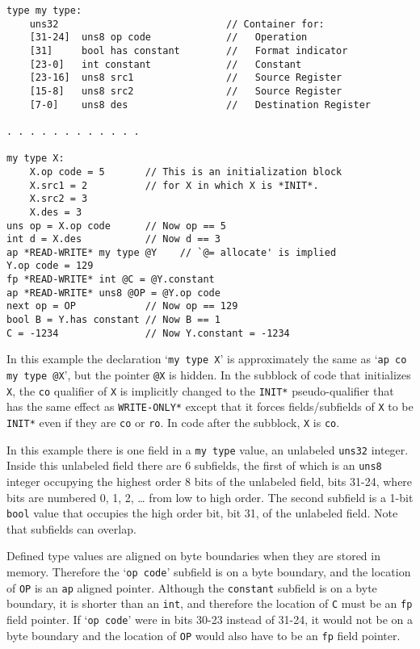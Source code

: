 \documentclass[12pt]{article}
\newenvironment{indpar}[1][0.3in]%
	{\begin{list}{}%
		     {\setlength{\itemsep}{0in}%
		      \setlength{\topsep}{0in}%
		      \setlength{\parsep}{1ex}%
		      \setlength{\labelwidth}{#1}%
		      \setlength{\leftmargin}{#1}%
		      \addtolength{\leftmargin}{\labelsep}}%
	 \item}%
	{\end{list}}
\begin{document}
\begin{indpar}\begin{verbatim}
type my type:
    uns32                             // Container for:
    [31-24]  uns8 op code             //   Operation
    [31]     bool has constant        //   Format indicator
    [23-0]   int constant             //   Constant
    [23-16]  uns8 src1                //   Source Register
    [15-8]   uns8 src2                //   Source Register
    [7-0]    uns8 des                 //   Destination Register

. . . . . . . . . . . .

my type X:
    X.op code = 5       // This is an initialization block
    X.src1 = 2          // for X in which X is *INIT*.
    X.src2 = 3
    X.des = 3
uns op = X.op code      // Now op == 5
int d = X.des           // Now d == 3
ap *READ-WRITE* my type @Y    // `@= allocate' is implied
Y.op code = 129
fp *READ-WRITE* int @C = @Y.constant
ap *READ-WRITE* uns8 @OP = @Y.op code
next op = OP            // Now op == 129
bool B = Y.has constant // Now B == 1
C = -1234               // Now Y.constant = -1234
\end{verbatim}\end{indpar}

In this example the declaration `{\tt my type X}' is approximately the same as
`{\tt ap co my type @X}', but the pointer {\tt @X} is hidden.
In the subblock of code that initializes {\tt X}, the {\tt co} qualifier
of {\tt X} is implicitly changed to the {\tt *INIT*} pseudo-qualifier that
has the same effect as {\tt *WRITE-ONLY*}
except that it forces fields/subfields of {\tt X} to be {\tt *INIT*}
even if they are {\tt co} or {\tt ro}.  In code after the subblock,
{\tt X} is {\tt co}.

In this example there is one field in a {\tt my type} value,
an unlabeled {\tt uns32} integer.
Inside this unlabeled field there are 6 subfields, the first of which is
an {\tt uns8} integer occupying the highest order 8
bits of the unlabeled field, bits 31-24,
where bits are numbered 0, 1, 2, \ldots{} from
low to high order.  The second subfield is a 1-bit {\tt bool}
value that occupies the high order bit, bit 31, of the unlabeled field.
Note that subfields can overlap.

Defined type values are aligned on byte boundaries when
they are stored in memory.  Therefore the `{\tt op code}' subfield
is on a byte boundary, and
the location of {\tt OP} is an {\tt ap} aligned pointer.  Although
the {\tt constant} subfield is on a byte boundary, it is
shorter than an {\tt int}, and therefore the
location of {\tt C} must be an {\tt fp} field pointer.
If `{\tt op code}' were in bits 30-23 instead of 31-24, it would
not be on a byte boundary and the location of {\tt OP} would
also have to be an {\tt fp} field pointer.
\end{document}
